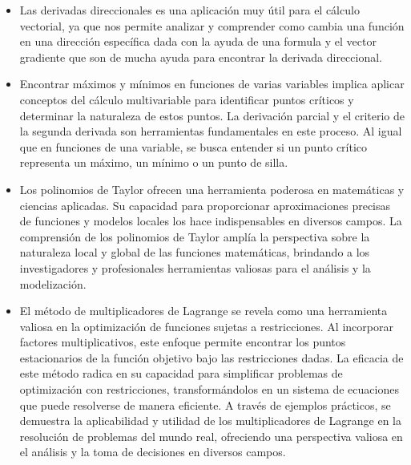 \begin{itemize}
  \item Las derivadas direccionales es una aplicación muy útil para el cálculo vectorial, ya que nos permite analizar y comprender como cambia una función en una dirección específica dada con la ayuda de una formula y el vector gradiente que son de mucha ayuda para encontrar la derivada direccional.  
  
  \item Encontrar máximos y mínimos en funciones de varias variables implica aplicar conceptos del cálculo multivariable para identificar puntos críticos y determinar la naturaleza de estos puntos. La derivación parcial y el criterio de la segunda derivada son herramientas fundamentales en este proceso. Al igual que en funciones de una variable, se busca entender si un punto crítico representa un máximo, un mínimo o un punto de silla. 
  
  \item Los polinomios de Taylor ofrecen una herramienta poderosa en matemáticas y ciencias aplicadas. Su capacidad para proporcionar aproximaciones precisas de funciones y modelos locales los hace indispensables en diversos campos. La comprensión de los polinomios de Taylor amplía la perspectiva sobre la naturaleza local y global de las funciones matemáticas, brindando a los investigadores y profesionales herramientas valiosas para el análisis y la modelización.
  
  \item El método de multiplicadores de Lagrange se revela como una herramienta valiosa en la optimización de funciones sujetas a restricciones. Al incorporar factores multiplicativos, este enfoque permite encontrar los puntos estacionarios de la función objetivo bajo las restricciones dadas. La eficacia de este método radica en su capacidad para simplificar problemas de optimización con restricciones, transformándolos en un sistema de ecuaciones que puede resolverse de manera eficiente. A través de ejemplos prácticos, se demuestra la aplicabilidad y utilidad de los multiplicadores de Lagrange en la resolución de problemas del mundo real, ofreciendo una perspectiva valiosa en el análisis y la toma de decisiones en diversos campos.
\end{itemize}






